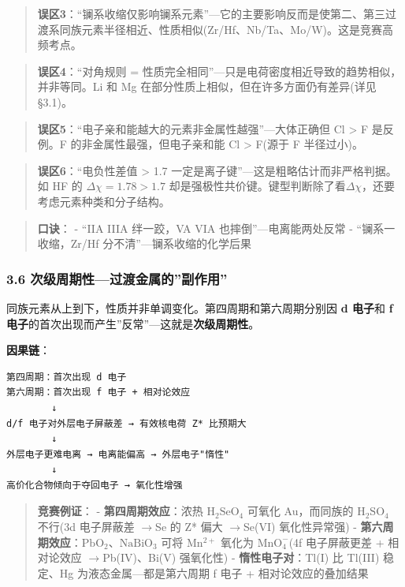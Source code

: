 \documentclass[a4paper,11pt]{ctexart}
\newcommand{\箭}{\ensuremath{\rightarrow}}
\newcommand{\左箭}{\ensuremath{\leftarrow}}
\newcommand{\上箭}{\ensuremath{\uparrow}}
\newcommand{\下箭}{\ensuremath{\downarrow}}
\newcommand{\衡}{\ensuremath{\rightleftharpoons}}
\newcommand{\双箭}{\ensuremath{\leftrightarrow}}
\newcommand{\约等于}{\ensuremath{\approx}}
\newcommand{\小于等于}{\ensuremath{\leq}}
\newcommand{\大于等于}{\ensuremath{\geq}}
\newcommand{\不等于}{\ensuremath{\neq}}
\newcommand{\西格马}{\ensuremath{\sigma}}
\newcommand{\派}{\ensuremath{\pi}}
\begin{document}
\begin{quote}
\textbf{误区3}：``镧系收缩仅影响镧系元素''---它的主要影响反而是使第二、第三过渡系同族元素半径相近、性质相似(Zr/Hf、Nb/Ta、Mo/W)。这是竞赛高频考点。
\end{quote}

\begin{quote}
\textbf{误区4}：``对角规则 = 性质完全相同''---只是电荷密度相近导致的趋势相似，并非等同。Li 和 Mg 在部分性质上相似，但在许多方面仍有差异(详见 §3.1)。
\end{quote}

\begin{quote}
\textbf{误区5}：``电子亲和能越大的元素非金属性越强''---大体正确但 Cl \textgreater{} F 是反例。F 的非金属性最强，但电子亲和能 Cl \textgreater{} F(源于 F 半径过小)。
\end{quote}

\begin{quote}
\textbf{误区6}：``电负性差值 \textgreater{} 1.7 一定是离子键''---这是粗略估计而非严格判据。如 HF 的 \(\Delta\chi=1.78>1.7\) 却是强极性共价键。键型判断除了看\(\Delta\chi\)，还要考虑元素种类和分子结构。
\end{quote}

\begin{quote}
\textbf{口诀}：
- ``IIA IIIA 绊一跤，VA VIA 也摔倒''---电离能两处反常
- ``镧系一收缩，Zr/Hf 分不清''---镧系收缩的化学后果
\end{quote}

\subsubsection{3.6 次级周期性---过渡金属的''副作用''}\label{ux6b21ux7ea7ux5468ux671fux6027ux8fc7ux6e21ux91d1ux5c5eux7684ux526fux4f5cux7528}

同族元素从上到下，性质并非单调变化。第四周期和第六周期分别因 \textbf{d 电子}和 \textbf{f 电子}的首次出现而产生''反常''---这就是\textbf{次级周期性}。

\textbf{因果链}：

\begin{verbatim}
第四周期：首次出现 d 电子
第六周期：首次出现 f 电子 + 相对论效应
        ↓
d/f 电子对外层电子屏蔽差 → 有效核电荷 Z* 比预期大
        ↓
外层电子更难电离 → 电离能偏高 → 外层电子"惰性"
        ↓
高价化合物倾向于夺回电子 → 氧化性增强
\end{verbatim}

\begin{quote}
\textbf{竞赛例证}：
- \textbf{第四周期效应}：浓热 \(\mathrm{H_2SeO_4}\) 可氧化 Au，而同族的 \(\mathrm{H_2SO_4}\) 不行(3d 电子屏蔽差 \箭 Se 的 Z* 偏大 \箭 Se(VI) 氧化性异常强)
- \textbf{第六周期效应}：\(\mathrm{PbO_2}\)、\(\mathrm{NaBiO_3}\) 可将 \(\mathrm{Mn^{2+}}\) 氧化为 \(\mathrm{MnO_4^-}\)(4f 电子屏蔽更差 + 相对论效应 \箭 Pb(IV)、Bi(V) 强氧化性)
- \textbf{惰性电子对}：Tl(I) 比 Tl(III) 稳定、Hg 为液态金属---都是第六周期 f 电子 + 相对论效应的叠加结果
\end{quote}
\end{document}
